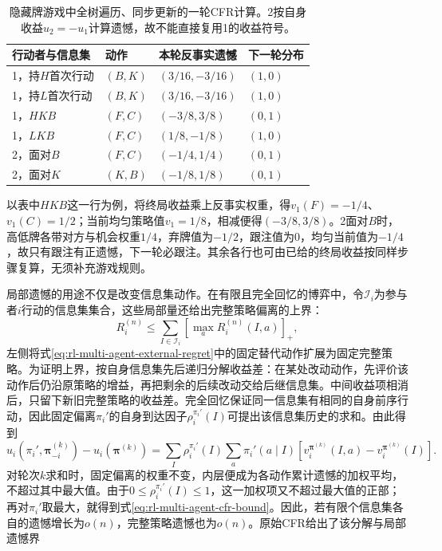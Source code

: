\begin{table}[htbp]
 \centering
 \begin{tabular}{@{}llll@{}}
 \toprule
 行动者与信息集 & 动作 & 本轮反事实遗憾 & 下一轮分布\\
 \midrule
 1，持$H$首次行动 & $(B,K)$ & $(3/16,-3/16)$ & $(1,0)$\\
 1，持$L$首次行动 & $(B,K)$ & $(3/16,-3/16)$ & $(1,0)$\\
 1，$HKB$ & $(F,C)$ & $(-3/8,3/8)$ & $(0,1)$\\
 1，$LKB$ & $(F,C)$ & $(1/8,-1/8)$ & $(1,0)$\\
 2，面对$B$ & $(F,C)$ & $(-1/4,1/4)$ & $(0,1)$\\
 2，面对$K$ & $(K,B)$ & $(-1/8,1/8)$ & $(0,1)$\\
 \bottomrule
 \end{tabular}
 \caption{隐藏牌游戏中全树遍历、同步更新的一轮CFR计算。2按自身收益$u_2=-u_1$计算遗憾，故不能直接复用1的收益符号。}
 \label{tab:rl-multi-agent-cfr-round}
\end{table}

以表中$HKB$这一行为例，将终局收益乘上反事实权重，得$v_1(F)=-1/4$、$v_1(C)=1/2$；当前均匀策略值$v_1=1/8$，相减便得$(-3/8,3/8)$。2面对$B$时，高低牌各带对方与机会权重$1/4$，弃牌值为$-1/2$，跟注值为0，均匀当前值为$-1/4$，故只有跟注有正遗憾，下一轮必跟注。其余各行也可由已给的终局收益按同样步骤复算，无须补充游戏规则。

局部遗憾的用途不仅是改变信息集动作。在有限且完全回忆的博弈中，令$\mathcal I_i$为参与者$i$行动的信息集集合，这些局部量还给出完整策略偏离的上界：
\begin{equation}
 R_i^{(n)}
 \leq\sum_{I\in\mathcal I_i}
        \left[\max_a R_i^{(n)}(I,a)\right]_+,
 \label{eq:rl-multi-agent-cfr-bound}
\end{equation}
左侧将式\eqref{eq:rl-multi-agent-external-regret}中的固定替代动作扩展为固定完整策略。为证明上界，按自身信息集先后递归分解收益差：在某处改动动作，先评价该动作后仍沿原策略的增益，再把剩余的后续改动交给后继信息集。中间收益项相消后，只留下新旧完整策略的收益差。完全回忆保证同一信息集有相同的自身前序行动，因此固定偏离$\pi_i'$的自身到达因子$\rho_i^{\pi_i'}(I)$可提出该信息集历史的求和。由此得到
\[
 u_i(\pi_i',\bm\pi_{-i}^{(k)})-u_i(\bm\pi^{(k)})
 =\sum_I\rho_i^{\pi_i'}(I)
       \sum_a\pi_i'(a\mid I)
       [v_i^{\bm\pi^{(k)}}(I,a)-v_i^{\bm\pi^{(k)}}(I)].
\]
对轮次$k$求和时，固定偏离的权重不变，内层便成为各动作累计遗憾的加权平均，不超过其中最大值。由于$0\leq\rho_i^{\pi_i'}(I)\leq1$，这一加权项又不超过最大值的正部；再对$\pi_i'$取最大，就得到式\eqref{eq:rl-multi-agent-cfr-bound}。因此，若有限个信息集各自的遗憾增长为$o(n)$，完整策略遗憾也为$o(n)$。原始CFR给出了该分解与局部遗憾界

